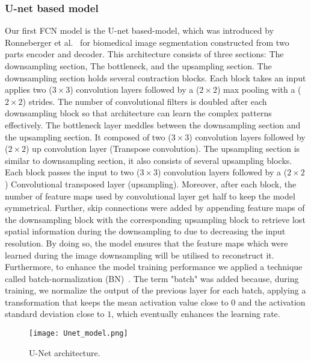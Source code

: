 \subsubsection{U-net based model}
	Our first FCN model is the U-net based-model, which was introduced by Ronneberger et al.~\cite{Ronneberger2015} for biomedical image segmentation constructed from two parts encoder and decoder. 
	This architecture consists of three sections: The downsampling section, The bottleneck, and the upsampling section. 
	The downsampling section holds several contraction blocks. 
	Each block takes an input applies two (\(3\times3\)) convolution layers followed by a (\(2\times2\)) max pooling with a (\(2\times2\)) strides. 
	The number of convolutional filters is doubled after each downsampling block so that architecture can learn the complex patterns effectively. 
	The bottleneck layer meddles between the downsampling section and the upsampling section. 
	It composed of two (\(3\times3\)) convolution layers followed by (\(2\times2\)) up convolution layer (Transpose convolution).
	The upsampling section is similar to downsampling section, it also consists of several upsampling blocks. 
	Each block passes the input to two (\(3\times3\)) convolution layers followed by a (\(2\times2\)) Convolutional transposed layer (upsampling). 
	Moreover, after each block, the number of feature maps used by convolutional layer get half to keep the model symmetrical. 
	Further, skip connections were added by appending feature maps of the downsampling block with the corresponding upsampling block to retrieve lost spatial information during the downsampling to due to decreasing the input resolution.
	By doing so, the model ensures that the feature maps which were learned during the image downsampling will be utilised to reconstruct it. 
	Furthermore, to enhance the model training performance we applied a technique called batch-normalization (BN)~\cite{Ioffe2015}.
	The term "batch" was added because, during training, we normalize the output of the previous layer for each batch, applying a transformation that keeps the mean activation value close to \(0\) and the activation standard deviation close to \(1\), which eventually enhances the learning rate.
	\begin{figure} [h!]
		\begin{center}
			\texttt{[image: Unet\_model.png]}
		\end{center}
		\caption{U-Net architecture.} 
		\label{fig:Unet}
	\end{figure}
